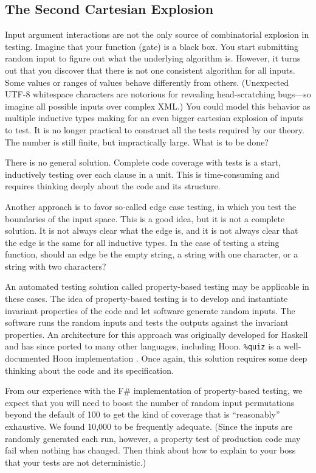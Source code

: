 \documentclass[twoside]{article}
\begin{document}
\subsection{The Second Cartesian Explosion}

Input argument interactions are not the only source of combinatorial explosion in testing. Imagine that your function (gate) is a black box. You start submitting random input to figure out what the underlying algorithm is. However, it turns out that you discover that there is not one consistent algorithm for all inputs. Some values or ranges of values behave differently from others. (Unexpected UTF-8 whitespace characters are notorious for revealing head-scratching bugs—so imagine all possible inputs over complex XML.) You could model this behavior as multiple inductive types making for an even bigger cartesian explosion of inputs to test. It is no longer practical to construct all the tests required by our theory. The number is still finite, but impractically large. What is to be done?

There is no general solution. Complete code coverage with tests is a start, inductively testing over each clause in a unit. This is time-consuming and requires thinking deeply about the code and its structure.

Another approach is to favor so-called edge case testing, in which you test the boundaries of the input space. This is a good idea, but it is not a complete solution. It is not always clear what the edge is, and it is not always clear that the edge is the same for all inductive types. In the case of testing a string function, should an edge be the empty string, a string with one character, or a string with two characters? 

An automated testing solution called property-based testing may be applicable in these cases. The idea of property-based testing is to develop and instantiate invariant properties of the code and let software generate random inputs. The software runs the random inputs and tests the outputs against the invariant properties. An architecture for this approach was originally developed for Haskell and has since ported to many other languages, including Hoon.  \texttt{\%quiz} is a well-documented Hoon implementation \citep{Hjort2023}.  Once again, this solution requires some deep thinking about the code and its specification.

From our experience with the F\# implementation of property-based testing, we expect that you will need to boost the number of random input permutations beyond the default of 100 to get the kind of coverage that is ``reasonably'' exhaustive. We found 10,000 to be frequently adequate. (Since the inputs are randomly generated each run, however, a property test of production code may fail when nothing has changed. Then think about how to explain to your boss that your tests are not deterministic.)
\end{document}
